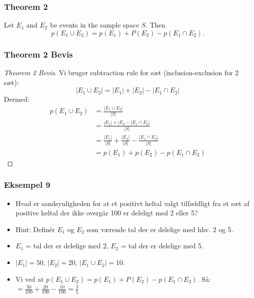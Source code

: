 \documentclass{beamer}
\begin{document}
\begin{frame}
  \frametitle{Theorem 2}
  \begin{theorem}
Let $E_{1}$ and $E_{2}$ be events in the sample space $S$. Then $$p(E_{1} \cup E_{2}) = p(E_{1})+P(E_{2})-p(E_{1} \cap E_{2}).$$
  \end{theorem} 
\end{frame}

\begin{frame}
  \frametitle{Theorem 2 Bevis}
  \begin{proof}[Theorem 2 Bevis]
    Vi bruger subtraction rule for sæt (inclusion-exclusion for 2 sæt):
    $$|E_{1} \cup E_{2}| = |E_{1}| + |E_{2}| - |E_{1} \cap E_{2}|$$
    Dermed:
    \begin{equation*}
      \begin{split}
        p(E_{1} \cup E_{2}) &= \frac{|E_{1} \cup E_{2}|}{|S|}\\
                         &= \frac{|E_{1}|+|E_{2}-|E_{1}\cap E_{2}|}{|S|}\\
                         &= \frac{|E_{1}|}{|S|} + \frac{|E_{2}|}{|S|}- \frac{|E_{1} \cap E_{2}|}{|S|}\\
        &= p(E_{1})+p(E_{2})-p(E_{1} \cap E_{2})
      \end{split}
    \end{equation*}
  \end{proof}
\end{frame}

\begin{frame}
  \frametitle{Eksempel 9}
 \begin{itemize}
 \item<1-> Hvad er sandsynligheden for at et positivt heltal valgt tilfældligt fra et sæt af positive heltal der ikke overgår 100 er deleligt med 2 eller 5?
 \item<1-> Hint: Definér $E_{1}$ og $E_{2}$ som værende tal der er delelige med hhv. 2 og 5.
 \item<2-> $E_{1}$ = tal der er delelige med 2, $E_{2}$ = tal der er delelige med 5.
 \item<3-> $|E_{1}| = 50$, $|E_{2}| = 20$, $|E_{1} \cup E_{2}| = 10$.
 \item<3-> Vi ved at $p(E_{1}\cup E_{2})=p(E_{1})+P(E_{2})-p(E_{1} \cap E_{2})$. Så: $= \frac{50}{100}+ \frac{20}{100}- \frac{10}{100} = \frac{3}{5}$
     
 \end{itemize} 
\end{frame}
\end{document}
